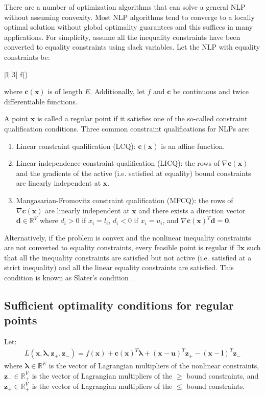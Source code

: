There are a number of optimization algorithms that can solve a general NLP without assuming convexity. Most NLP algorithms tend to converge to a locally optimal solution without global optimality guarantees and this suffices in many applications. For simplicity, assume all the inequality constraints have been converted to equality constraints using slack variables. Let the NLP with equality constraints be:
\begin{mini!}|l|[3]
  {}{f()}{}{}
\end{mini!}
where $\bm{c}(\bm{x})$ is of length $E$. Additionally, let $f$ and $\bm{c}$ be continuous and twice differentiable functions.

A point $\bm{x}$ is called a regular point if it satisfies one of the so-called constraint qualification conditions. Three common constraint qualifications for NLPs are:
\begin{enumerate}
    \item Linear constraint qualification (LCQ): $\bm{c}(\bm{x})$ is an affine function.
    \item Linear independence constraint qualification (LICQ): the rows of $\nabla \bm{c}(\bm{x})$ and the gradients of the active (i.e. satisfied at equality) bound constraints are linearly independent at $\bm{x}$.
    \item Mangasarian-Fromovitz constraint qualification (MFCQ): the rows of $\nabla \bm{c}(\bm{x})$ are linearly independent at $\bm{x}$ and there exists a direction vector $\bm{d} \in \mathbb{R}^V$ where $d_i > 0$ if $x_i = l_i$, $d_i < 0$ if $x_i = u_i$, and $\nabla \bm{c}(\bm{x})^T \bm{d} = \bm{0}$.
\end{enumerate}

Alternatively, if the problem is convex and the nonlinear inequality constraints are not converted to equality constraints, every feasible point is regular if $\exists \bm{x}$ such that all the inequality constraints are satisfied but not active (i.e. satisfied at a strict inequality) and all the linear equality constraints are satisfied. This condition is known as Slater's condition \citep{Boyd2009}.

\subsection{Sufficient optimality conditions for regular points}

Let:
\begin{align}
  L(\bm{x}, \bm{\lambda}, \bm{z}_+, \bm{z}_-) = f(\bm{x}) + \bm{c}(\bm{x})^T \bm{\lambda} + (\bm{x} - \bm{u})^T \bm{z}_+  - (\bm{x} - \bm{l})^T \bm{z}_-
\end{align}
where $\bm{\lambda} \in \mathbb{R}^E$ is the vector of Lagrangian multipliers of the nonlinear constraints, $\bm{z}_- \in \mathbb{R}^V_+$ is the vector of Lagrangian multipliers of the $\geq$ bound constraints, and $\bm{z}_+ \in \mathbb{R}^V_+$ is the vector of Lagrangian multipliers of the $\leq$ bound constraints.


